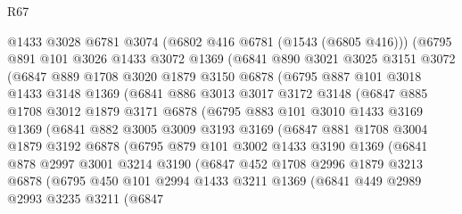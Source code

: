 \begin{lexlean}{R67}
\begin{coremodule}
      @1433
      @3028
      @6781
      @3074
      (@6802 @416 @6781 (@1543 (@6805 @416)))
      (@6795
        @891
        @101
        @3026
        @1433
        @3072
        @1369
        (@6841
          @890
          @3021
          @3025
          @3151
          @3072
          (@6847
            @889
            @1708
            @3020
            @1879
            @3150
            @6878
            (@6795
              @887
              @101
              @3018
              @1433
              @3148
              @1369
              (@6841
                @886
                @3013
                @3017
                @3172
                @3148
                (@6847
                  @885
                  @1708
                  @3012
                  @1879
                  @3171
                  @6878
                  (@6795
                    @883
                    @101
                    @3010
                    @1433
                    @3169
                    @1369
                    (@6841
                      @882
                      @3005
                      @3009
                      @3193
                      @3169
                      (@6847
                        @881
                        @1708
                        @3004
                        @1879
                        @3192
                        @6878
                        (@6795
                          @879
                          @101
                          @3002
                          @1433
                          @3190
                          @1369
                          (@6841
                            @878
                            @2997
                            @3001
                            @3214
                            @3190
                            (@6847
                              @452
                              @1708
                              @2996
                              @1879
                              @3213
                              @6878
                              (@6795
                                @450
                                @101
                                @2994
                                @1433
                                @3211
                                @1369
                                (@6841
                                  @449
                                  @2989
                                  @2993
                                  @3235
                                  @3211
                                  (@6847

\end{coremodule}
\end{lexlean}
